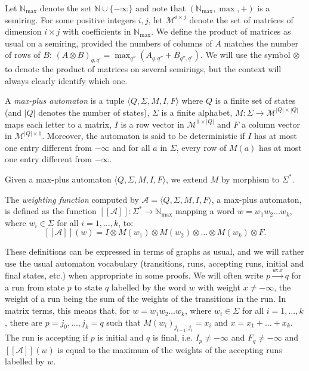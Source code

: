 \documentclass{lmcs}
\theoremstyle{remark}
\newcommand{\N}{\mathbb{N}}
\newcommand{\Nmax}{\N_{\max}}
\newcommand{\matrices}[2]{\mathcal{M}^{#1 \times #2}}
\newcommand{\autA}{\mathcal{A}}
\newcommand{\brfunc}[1]{[\![#1]\!]}
\newcommand{\funcA}{\brfunc{\autA}}
\theoremstyle{remark}
\begin{document}
Let $\Nmax$ denote the set $\N \cup \{-\infty\}$ and note that $(\Nmax, \max, +)$ is a semiring. For some positive integers $i,j$, let $\matrices{i}{j}$ denote the set of matrices of dimension $i \times j$ with coefficients in $\Nmax$. We define the product of matrices as usual on a semiring, provided the numbers of columns of $A$ matches the number of rows of $B$: $(A\otimes B)_{q,q'} = \max_{q''} \left(A_{q,q''} + B_{q'',q'}\right)$. We will use the symbol $\otimes$ to denote the product of matrices on several semirings, but the context will always clearly identify which one.
\begin{defi}
A \emph{max-plus automaton} is a tuple $\langle Q, \Sigma, M, I, F\rangle$ where $Q$ is a finite set of states (and $|Q|$ denotes the number of states), $\Sigma$ is a finite alphabet, $M: \Sigma \to \matrices{|Q|}{|Q|}$ maps each letter to a matrix, $I$ is a row vector in $\matrices{1}{|Q|}$ and $F$ a column vector in $\matrices{|Q|}{1}$. Moreover, the automaton is said to be deterministic if $I$ has at most one entry different from $-\infty$ and for all $a$ in $\Sigma$, every row of $M(a)$ has at most one entry different from $-\infty$.
\end{defi}

Given a max-plus automaton $\langle Q, \Sigma, M, I, F\rangle$, we extend $M$ by morphism to $\Sigma^*$.

\begin{defi}
The \emph{weighting function} computed by $\autA = \langle Q, \Sigma, M, I, F\rangle$, a max-plus automaton, is defined as the function $\funcA:\Sigma^*\to \Nmax$ mapping a word $w = w_1w_2\dots w_k$, where $w_i \in \Sigma$ for all $i=1,\ldots,k$, to:
\[
\funcA(w) = I \otimes M(w_1)\otimes M(w_2)\otimes \dots \otimes M(w_k) \otimes F.
\]
\end{defi}

These definitions can be expressed in terms of graphs as usual, and we will rather use the usual automaton vocabulary (transitions, runs, accepting runs, initial and final states, etc.) when appropriate in some proofs. We will often write $p\xrightarrow{w:x}q$ for a run from state $p$ to state $q$ labelled by the word $w$ with weight $x \neq -\infty$, the weight of a run being the sum of the weights of the transitions in the run. In matrix terms, this means that, for $w = w_1w_2\dots w_k$, where $w_i \in \Sigma$ for all $i=1,\ldots,k$, there are $p=j_0, \ldots, j_k=q$ such that $M(w_i)_{j_{i-1},j_i} = x_i$ and $x = x_1 + \ldots + x_k$. The run is accepting if $p$ is initial and $q$ is final, i.e. $I_p \neq -\infty$ and $F_q \neq -\infty$ and $\funcA(w)$ is equal to the maximum of the weights of the accepting runs labelled by $w$.
\end{document}
